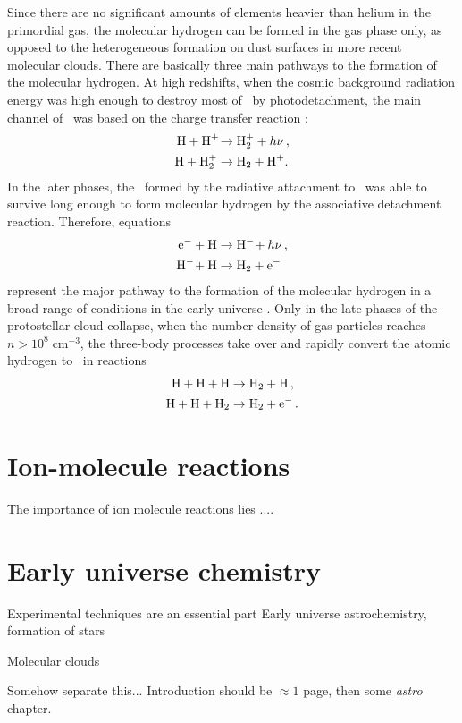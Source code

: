 Since there are no significant amounts of elements heavier than helium in
the primordial gas, the molecular hydrogen can be formed in the gas phase
only, as opposed to the heterogeneous formation on dust surfaces in more
recent molecular clouds. There are basically three main pathways to the
formation of the molecular hydrogen. At high redshifts, when the cosmic
background radiation energy was high enough to destroy most of \Hminus\ by
photodetachment, the main channel of \Htwo\ was based on the
charge transfer reaction \citep{glover2006}:
\begin{align}
    {\ensuremath{\text{H}}} + {\text{H}^+\!} &\to {\ensuremath{\text{H}}}_2^+ + h\nu\,,\\
    {\text{H}} + {\text{H}}_2^+ &\to {\ensuremath{\text{H}}}_2 + {\text{H}^+\!}\,.
\end{align}
In the later phases, the \Hminus\ formed by the radiative attachment to \hydrogen\
was able to survive long enough to form molecular hydrogen by the associative
detachment reaction. Therefore, equations
\begin{align}
    {\ensuremath{\text{e}^-}} + {\text{H}} &\to {\ensuremath{\text{H}^-\!}} + h\nu\,,\\
    {\text{H}^-\!} + {\text{H}} &\to {\ensuremath{\text{H}}}_2 + {\text{e}^-}\,
\end{align}
represent the major pathway to the formation of the molecular hydrogen in a
broad range of conditions in the early
universe \citep{glover2006}. Only in the late phases of the protostellar cloud
collapse, when the number density of gas particles reaches
$n>10^8\;\text{cm}^{-3}$, the three-body processes take over and rapidly
convert the atomic hydrogen to \Htwo\ in reactions \citep{palla1983,turk2011}
\begin{align}
    {\ensuremath{\text{H}}} + {\text{H}} + {\text{H}} &\to {\ensuremath{\text{H}_2}} + {\text{H}}\,,\\
    {\text{H}} + {\text{H}} + {\text{H}_2} &\to {\ensuremath{\text{H}}}_2 + {\text{e}^-}\,.
\end{align}

\section{Ion-molecule reactions}
The importance of ion molecule reactions lies ....


\section{Early universe chemistry}

Experimental techniques are an essential part
Early universe astrochemistry, formation of stars

Molecular clouds

Somehow separate this... Introduction should be $\approx1$ page, then some {\em astro} chapter.

\endgroup
